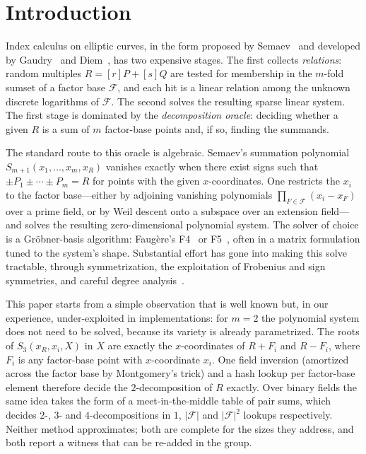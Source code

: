 \documentclass[10pt,a4paper]{article}
\theoremstyle{remark}
\newcommand{\Fb}{\mathcal{F}}
\newcommand{\Sem}[1]{S_{#1}}
\newcommand{\abs}[1]{\lvert #1 \rvert}
\begin{document}
\section{Introduction}
\label{sec:intro}

Index calculus on elliptic curves, in the form proposed by
Semaev~\cite{semaev2004} and developed by Gaudry~\cite{gaudry2009} and
Diem~\cite{diem2011}, has two expensive stages. The first collects
\emph{relations}: random multiples $R = [r]P + [s]Q$ are tested for
membership in the $m$-fold sumset of a factor base $\Fb$, and each hit is
a linear relation among the unknown discrete logarithms of $\Fb$. The
second solves the resulting sparse linear system. The first stage is
dominated by the \emph{decomposition oracle}: deciding whether a given $R$
is a sum of $m$ factor-base points and, if so, finding the summands.

The standard route to this oracle is algebraic. Semaev's summation
polynomial $\Sem{m+1}(x_1, \ldots, x_m, x_R)$ vanishes exactly when
there exist signs such that $\pm P_1 \pm \cdots \pm P_m = R$ for points
with the given $x$-coordinates. One restricts the $x_i$ to the factor
base---either by adjoining vanishing polynomials $\prod_{F\in\Fb}(x_i -
x_F)$ over a prime field, or by Weil descent onto a subspace over an
extension field---and solves the resulting zero-dimensional polynomial
system. The solver of choice is a Gr\"obner-basis algorithm:
Faug\`ere's F4~\cite{faugere1999} or F5~\cite{faugere2002}, often in a
matrix formulation tuned to the system's shape. Substantial effort has
gone into making this solve tractable, through symmetrization, the
exploitation of Frobenius and sign symmetries, and careful degree
analysis~\cite{fppr2012,petitquisquater2012,galbraithgebregiyorgis2014}.

This paper starts from a simple observation that is well known but, in
our experience, under-exploited in implementations: for $m = 2$ the
polynomial system does not need to be solved, because its variety is
already parametrized. The roots of $\Sem{3}(x_R, x_i, X)$ in $X$ are
exactly the $x$-coordinates of $R + F_i$ and $R - F_i$, where $F_i$ is
any factor-base point with $x$-coordinate $x_i$. One field inversion
(amortized across the factor base by Montgomery's trick) and a hash
lookup per factor-base element therefore decide the $2$-decomposition of
$R$ exactly. Over binary fields the same idea takes the form of a
meet-in-the-middle table of pair sums, which decides $2$-, $3$- and
$4$-decompositions in $1$, $\abs{\Fb}$ and $\abs{\Fb}^2$ lookups
respectively. Neither method approximates; both are complete for the
sizes they address, and both report a witness that can be re-added in
the group.
\end{document}
